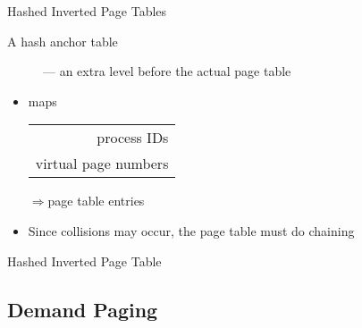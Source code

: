 \begin{frame}{Hashed Inverted Page Tables}
  \begin{description}
  \item[A hash anchor table] --- an extra level before the actual page table 
  \end{description}
  \begin{itemize}
  \item maps
    \begin{scriptsize}
      \begin{tabular}{r}
        process IDs\\
        virtual page numbers
      \end{tabular}
    \end{scriptsize}
    $\Rightarrow{}$page table entries
  \item Since collisions may occur, the page table must do chaining
  \end{itemize}
  \begin{center}
  \end{center}
\end{frame}

\begin{frame}{Hashed Inverted Page Table}
  \begin{center}
  \end{center}
\end{frame}

\subsection{Demand Paging}

